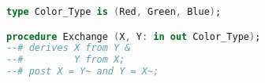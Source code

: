 \begin{lstlisting}[language=Ada]
type Color_Type is (Red, Green, Blue);

procedure Exchange (X, Y: in out Color_Type);
--# derives X from Y &
--#         Y from X;
--# post X = Y~ and Y = X~;
\end{lstlisting}
